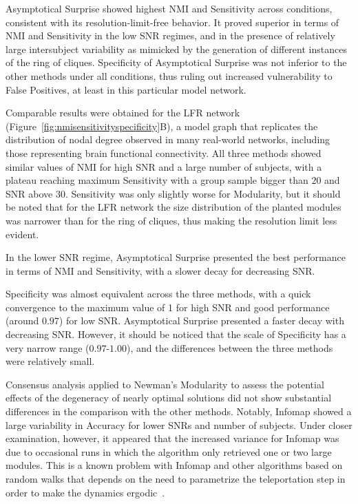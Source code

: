 Asymptotical Surprise showed highest NMI and Sensitivity across conditions, consistent with its resolution-limit-free behavior.
It proved superior in terms of NMI and Sensitivity in the low SNR regimes, and in the presence of relatively large intersubject variability as mimicked by the generation of different instances of the ring of cliques.
Specificity of Asymptotical Surprise was not inferior to the other methods under all conditions, thus ruling out increased vulnerability to False Positives, at least in this particular model network.

Comparable results were obtained for the LFR network (Figure~\ref{fig:nmisensitivityspecificity}B), a model graph that replicates the distribution of nodal degree observed in many real-world networks, including those representing brain functional connectivity.
All three methods showed similar values of NMI for high SNR and a large number of subjects, with a plateau reaching maximum Sensitivity with a group sample bigger than $20$ and SNR above $30$.
Sensitivity was only slightly worse for Modularity, but it should be noted that for the LFR network the size distribution of the planted modules was narrower than for the ring of cliques, thus making the resolution limit less evident.

In the lower SNR regime, Asymptotical Surprise presented the best performance in terms of NMI and Sensitivity, with a slower decay for decreasing SNR.

Specificity was almost equivalent across the three methods, with a quick convergence to the maximum value of 1 for high SNR and good performance (around $0.97$) for low SNR.
Asymptotical Surprise presented a faster decay with decreasing SNR.
However, it should be noticed that the scale of Specificity has a very narrow range ($0.97$-$1.00$), and the differences between the three methods were relatively small.

Consensus analysis applied to Newman's Modularity to assess the potential effects of the degeneracy of nearly optimal solutions did not show substantial differences in the comparison with the other methods.
Notably, Infomap showed a large variability in Accuracy for lower SNRs and number of subjects.
Under closer examination, however, it appeared that the increased variance for Infomap was due to occasional runs in which the algorithm only retrieved one or two large modules.
This is a known problem with Infomap and other algorithms based on random walks that depends on the need to parametrize the teleportation step in order to make the dynamics ergodic~\cite{lambiotte2012}.

